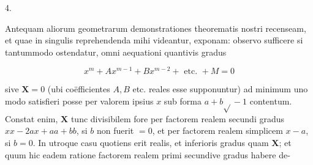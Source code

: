 \documentclass[twoside,12pt, showframe]{memoir}
\begin{document}
4.

Antequam aliorum geometrarum demonstrationes theorematis nostri recenseam, et quae in singulis reprehendenda mihi videantur, exponam: observo sufficere si tantummodo ostendatur, omni aequationi quantivis gradus

\[
x^{m}+A x^{m-1}+B x^{m-2}+\text { etc. }+M=0
\]

sive \(\boldsymbol{X}=0\) (ubi coëfficientes \(A, B\) etc. reales esse supponuntur) ad minimum uno modo satisfieri posse per valorem ipsius \(x\) sub forma \(a+b \sqrt{ }-1\) contentum. Constat enim, \(\boldsymbol{X}\) tunc divisibilem fore per factorem realem secundi gradus \(x x-2 a x+a a+b b\), si \(b\) non fuerit \(=0\), et per factorem realem simplicem \(x-a\), si \(b=0\). In utroque casu quotiens erit realis, et inferioris gradus quam \(\mathbf{X}\); et quum hic eadem ratione factorem realem primi secundive gradus habere de-
\end{document}
